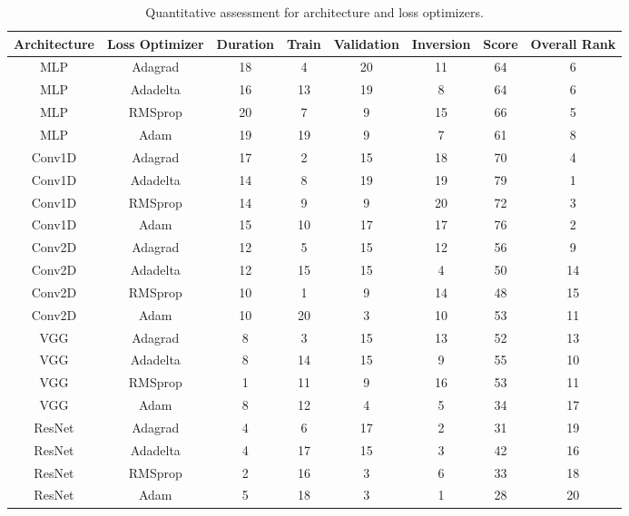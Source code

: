 \clearpage
\begin{table*}[ht!]
    \footnotesize
    \centering
    \begin{tabular}{@{}cccccccc@{}}\toprule
Architecture & Loss Optimizer & Duration & Train & Validation & Inversion & Score & Overall Rank \\ \hline
MLP          & Adagrad        & 18       & 4     & 20         & 11        & 64    & 6    \\
MLP          & Adadelta       & 16       & 13    & 19         & 8         & 64    & 6    \\
MLP          & RMSprop        & 20       & 7     & 9          & 15        & 66    & 5    \\
MLP          & Adam           & 19       & 19    & 9          & 7         & 61    & 8    \\
Conv1D       & Adagrad        & 17       & 2     & 15         & 18        & 70    & 4    \\
Conv1D       & Adadelta       & 14       & 8     & 19         & 19        & 79    & 1    \\
Conv1D       & RMSprop        & 14       & 9     & 9          & 20        & 72    & 3    \\
Conv1D       & Adam           & 15       & 10    & 17         & 17        & 76    & 2    \\
Conv2D       & Adagrad        & 12       & 5     & 15         & 12        & 56    & 9    \\
Conv2D       & Adadelta       & 12       & 15    & 15         & 4         & 50    & 14   \\
Conv2D       & RMSprop        & 10       & 1     & 9          & 14        & 48    & 15   \\
Conv2D       & Adam           & 10       & 20    & 3          & 10        & 53    & 11   \\
VGG          & Adagrad        & 8        & 3     & 15         & 13        & 52    & 13   \\
VGG          & Adadelta       & 8        & 14    & 15         & 9         & 55    & 10   \\
VGG          & RMSprop        & 1        & 11    & 9          & 16        & 53    & 11   \\
VGG          & Adam           & 8        & 12    & 4          & 5         & 34    & 17   \\
ResNet       & Adagrad        & 4        & 6     & 17         & 2         & 31    & 19   \\
ResNet       & Adadelta       & 4        & 17    & 15         & 3         & 42    & 16   \\
ResNet       & RMSprop        & 2        & 16    & 3          & 6         & 33    & 18   \\
ResNet       & Adam           & 5        & 18    & 3          & 1         & 28    & 20   \\\hline
\end{tabular}
\caption{Quantitative assessment for architecture and loss optimizers.}\label{tab:quantitative_assessment_arch_loss}
\end{table*}  

